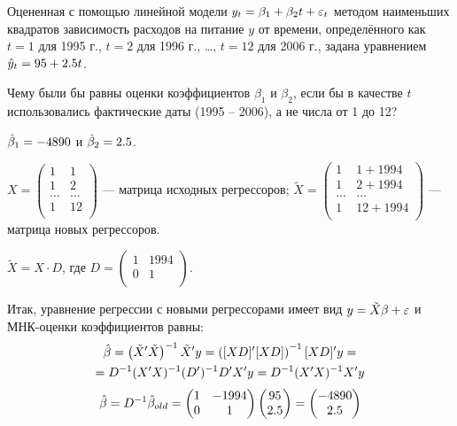 \begin{problem}
Оцененная с помощью линейной модели $y_t = \beta_1 + \beta_2 t + \varepsilon_t$ методом наименьших квадратов зависимость расходов на питание $y$ от времени, определённого как $t = 1$ для 1995 г., $t = 2$ для 1996 г., \ldots, $t = 12$ для 2006 г., задана уравнением $\hat{y}_t = 95 + 2.5 t$.

Чему были бы равны оценки коэффициентов $\beta_1$ и $\beta_2$, если бы в качестве $t$ использовались фактические даты (1995 – 2006), а не числа от 1 до 12?


\begin{sol}
$\hat{\beta}_1 = -4890$ и $\hat{\beta}_2 = 2.5$.

$X = \begin{pmatrix}
1 & 1 \\
1 & 2 \\
\ldots & \ldots \\
1 & 12 \\
\end{pmatrix}$ — матрица исходных регрессоров; $\tilde{X} = \begin{pmatrix}
1 & 1+1994\\
1 & 2+1994 \\
\ldots & \ldots \\
1 & 12+1994 \\
\end{pmatrix}$ — матрица новых регрессоров.

$\tilde{X} = X \cdot D$, где $D = \begin{pmatrix}
1 & 1994 \\
0 & 1 \\
\end{pmatrix}$.

Итак, уравнение регрессии с новыми регрессорами имеет вид $y = \tilde{X}\beta + \varepsilon$ и МНК-оценки коэффициентов равны:
\begin{multline*}
\hat{\beta} = \left( \tilde{X}' \tilde{X} \right)^{-1} \tilde{X}' y = \left( [XD]' [XD] \right)^{-1} [XD]' y = \\
= D^{-1} (X' X)^{-1} (D')^{-1} D' X' y = D^{-1} (X' X)^{-1}X' y
\end{multline*}
\[
\hat{\beta} = D^{-1}\hat{\beta}_{old} = \begin{pmatrix}
1 & -1994 \\
0 & 1 \\
\end{pmatrix} \begin{pmatrix}
95 \\
2.5 \\
\end{pmatrix} = \begin{pmatrix}
-4890 \\
2.5 \\
\end{pmatrix}
\]
\end{sol}
\end{problem}


